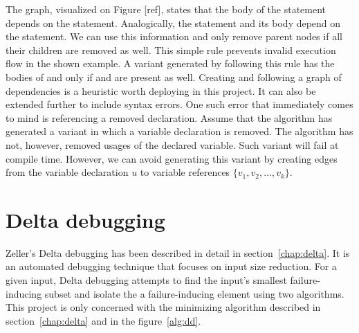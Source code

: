 The graph, visualized on Figure [ref], states that the body of 
the  statement depends on the  statement. 
Analogically, the  statement and its body depend on 
the  statement. 
We can use this information and only remove parent nodes if all their 
children are removed as well. 
This simple rule prevents invalid execution flow in the shown example. 
A variant generated by following this rule has the bodies of  
and  only if  and  are 
present as well. 
Creating and following a graph of dependencies is a heuristic worth 
deploying in this project. 
It can also be extended further to include syntax errors. 
One such error that immediately comes to mind is referencing a removed 
declaration. 
Assume that the algorithm has generated a variant in which a variable 
declaration is removed. 
The algorithm has not, however, removed usages of the declared variable. 
Such variant will fail at compile time. 
However, we can avoid generating this variant by creating edges from 
the variable declaration $u$ to variable references
$\{v_1, v_2, \ldots, v_k\}$. 

\section{Delta debugging}\label{chap:deltaimplementation}

Zeller's Delta debugging \cite{Zeller99, Zeller02, Zeller01} has been 
described in detail in section~\ref{chap:delta}.
It is an automated debugging technique that focuses on input size reduction.
For a given input, Delta debugging attempts to find the input's 
smallest failure-inducing subset and isolate the a failure-inducing element 
using two algorithms.
This project is only concerned with the minimizing algorithm described in
section~\ref{chap:delta} and in the figure~\ref{alg:dd}.

